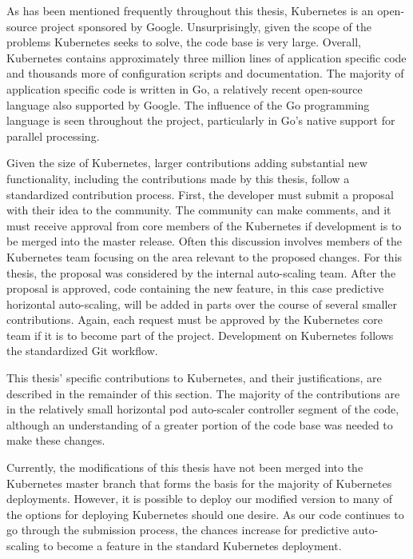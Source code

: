 As has been mentioned frequently throughout this thesis, Kubernetes is an
open-source project sponsored by Google. Unsurprisingly, given the scope of the
problems Kubernetes seeks to solve, the code base is very large. Overall,
Kubernetes contains approximately three million lines of application specific
code and thousands more of configuration scripts and documentation. The majority
of application specific code is written in Go, a relatively recent open-source
language also supported by Google. The influence of the Go programming language
is seen throughout the project, particularly in Go's native support for parallel
processing.

Given the size of Kubernetes, larger contributions adding substantial new functionality,
including the contributions made by this thesis, follow a standardized contribution process.
First, the developer must submit a proposal with their idea to the community.
The community can make comments, and it must receive approval from core members
of the Kubernetes if development is to be merged into the master release. Often
this discussion involves members of the Kubernetes team focusing on the area
relevant to the proposed changes. For this thesis, the proposal was considered
by the internal auto-scaling team. After the proposal is approved, code
containing the new feature, in this case predictive horizontal auto-scaling,
will be added in parts over the course of several smaller contributions. Again,
each request must be approved by the Kubernetes core team if it is to become
part of the project. Development on Kubernetes follows the standardized Git workflow.

This thesis' specific contributions to Kubernetes, and their justifications,
are described in the remainder of this section. The majority of the
contributions are in the relatively small horizontal pod auto-scaler controller
segment of the code, although an understanding of a greater portion of the code
base was needed to make these changes.

Currently, the modifications of this thesis have not been merged into the
Kubernetes master branch that forms the basis for the majority of Kubernetes
deployments. However, it is possible to deploy our modified version to many of
the options for deploying Kubernetes should one desire. As our code continues to
go through the submission process, the chances increase for predictive
auto-scaling to become a feature in the standard Kubernetes deployment.
